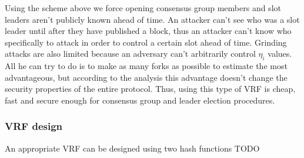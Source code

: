 Using the scheme above we force opening consensus group members and slot leaders aren't publicly known ahead of time.
An attacker can't see who was a slot leader until after they have published a block, thus an attacker can't know who specifically to attack in order to control a certain slot ahead of time.
Grinding attacks are also limited because an adversary can't arbitrarily control $\eta_i$ values.
All he can try to do is to make as many forks as possible to estimate the most advantageous, but according to the analysis this advantage doesn't change the security properties of the entire protocol.
Thus, using this type of VRF is cheap, fast and secure enough for consensus group and leader election procedures.

\subsubsection{VRF design}
An appropriate VRF can be designed using two hash functions
TODO

